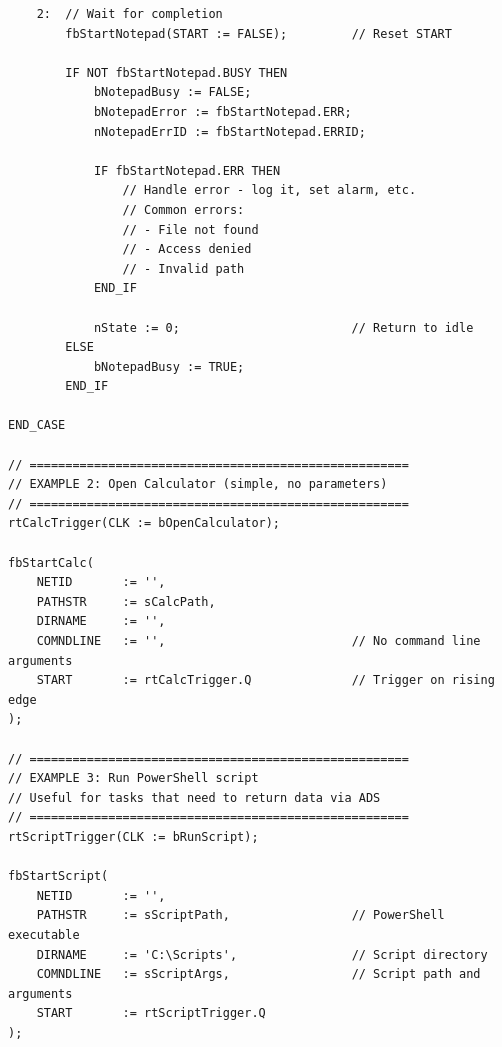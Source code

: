 \documentclass[11pt,a4paper]{article}
\begin{document}
\begin{lstlisting}
    2:  // Wait for completion
        fbStartNotepad(START := FALSE);         // Reset START
        
        IF NOT fbStartNotepad.BUSY THEN
            bNotepadBusy := FALSE;
            bNotepadError := fbStartNotepad.ERR;
            nNotepadErrID := fbStartNotepad.ERRID;
            
            IF fbStartNotepad.ERR THEN
                // Handle error - log it, set alarm, etc.
                // Common errors:
                // - File not found
                // - Access denied
                // - Invalid path
            END_IF
            
            nState := 0;                        // Return to idle
        ELSE
            bNotepadBusy := TRUE;
        END_IF
        
END_CASE

// =====================================================
// EXAMPLE 2: Open Calculator (simple, no parameters)
// =====================================================
rtCalcTrigger(CLK := bOpenCalculator);

fbStartCalc(
    NETID       := '',
    PATHSTR     := sCalcPath,
    DIRNAME     := '',
    COMNDLINE   := '',                          // No command line arguments
    START       := rtCalcTrigger.Q              // Trigger on rising edge
);

// =====================================================
// EXAMPLE 3: Run PowerShell script
// Useful for tasks that need to return data via ADS
// =====================================================
rtScriptTrigger(CLK := bRunScript);

fbStartScript(
    NETID       := '',
    PATHSTR     := sScriptPath,                 // PowerShell executable
    DIRNAME     := 'C:\Scripts',                // Script directory
    COMNDLINE   := sScriptArgs,                 // Script path and arguments
    START       := rtScriptTrigger.Q
);
\end{lstlisting}
\end{document}
